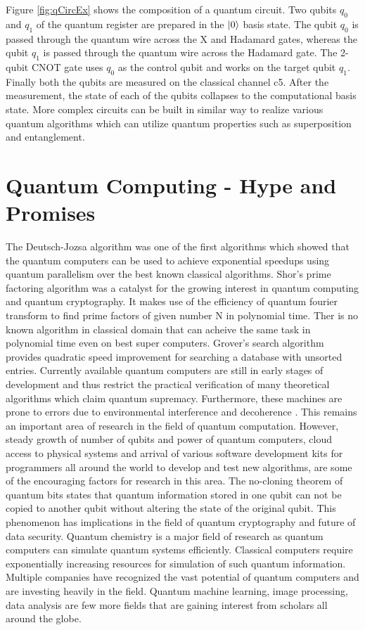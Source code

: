 \documentclass[english,a4paper,11pt,oneside,onecolumn]{book}
\begin{document}
Figure \ref{fig:qCircEx} shows the composition of a quantum circuit. Two qubits \(q_0\) and \(q_1\) of the quantum register are prepared in the \(\ket{0}\) basis state. The qubit \(q_0\) is passed through the quantum wire across the X and Hadamard gates, whereas the qubit \(q_1\) is passed through the quantum wire across the Hadamard gate. The 2-qubit CNOT gate uses \(q_0\) as the control qubit and works on the target qubit \(q_1\). Finally both the qubits are measured on the classical channel c5. After the measurement, the state of each of the qubits collapses to the computational basis state. More complex circuits can be built in similar way to realize various quantum algorithms which can utilize quantum properties such as superposition and entanglement.

\section{Quantum Computing - Hype and Promises}
\label{sec:qHype}
The Deutsch-Jozsa algorithm \cite{aradyamath_2019_quantum} was one of the first algorithms which showed that the quantum computers can be used to achieve exponential speedups using quantum parallelism over the best known classical algorithms. Shor's prime factoring algorithm \cite{shor_2019_algorithms} was a catalyst for the growing interest in quantum computing and quantum cryptography. It makes use of the efficiency of quantum fourier transform to find prime factors of given number N in polynomial time. Ther is no known algorithm in classical domain that can acheive the same task in polynomial time even on best super computers. Grover's search algorithm \cite{grover_1996_a} provides quadratic speed improvement for searching a database with unsorted entries.
Currently available quantum computers are still in early stages of development and thus restrict the practical verification of many theoretical algorithms which claim quantum supremacy. Furthermore, these machines are prone to errors due to environmental interference and decoherence \cite{schuld_2020_circuitcentric}. This remains an important area of research in the field of quantum computation. However, steady growth of number of qubits and power of quantum computers, cloud access to physical systems and arrival of various software development kits for programmers all around the world to develop and test new algorithms, are some of the encouraging factors for research in this area.
The no-cloning theorem \cite{wootters_1982_a} of quantum bits states that quantum information stored in one qubit can not be copied to another qubit without altering the state of the original qubit. This phenomenon has implications in the field of quantum cryptography and future of data security. Quantum chemistry is a major field of research as quantum computers can simulate quantum systems efficiently. Classical computers require exponentially increasing resources for simulation of such quantum information. Multiple companies have recognized the vast potential of quantum computers and are investing heavily in the field. Quantum machine learning, image processing, data analysis are few more fields that are gaining interest from scholars all around the globe.
\end{document}
